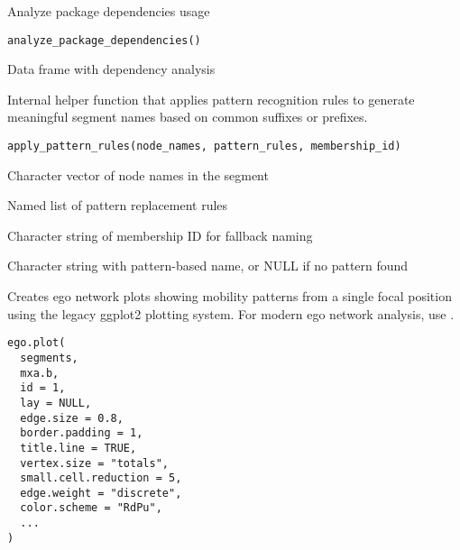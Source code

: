 \documentclass[a4paper]{book}
\begin{document}
%
\begin{Description}
Analyze package dependencies usage
\end{Description}
%
\begin{Usage}
\begin{verbatim}
analyze_package_dependencies()
\end{verbatim}
\end{Usage}
%
\begin{Value}
Data frame with dependency analysis
\end{Value}
%
\begin{Description}
Internal helper function that applies pattern recognition rules to generate
meaningful segment names based on common suffixes or prefixes.
\end{Description}
%
\begin{Usage}
\begin{verbatim}
apply_pattern_rules(node_names, pattern_rules, membership_id)
\end{verbatim}
\end{Usage}
%
\begin{Arguments}
\begin{ldescription}
\item[\code{node\_names}] Character vector of node names in the segment

\item[\code{pattern\_rules}] Named list of pattern replacement rules

\item[\code{membership\_id}] Character string of membership ID for fallback naming
\end{ldescription}
\end{Arguments}
%
\begin{Value}
Character string with pattern-based name, or NULL if no pattern found
\end{Value}
%
\begin{Description}
Creates ego network plots showing mobility patterns from a single focal position
using the legacy ggplot2 plotting system. For modern ego network analysis,
use .
\end{Description}
%
\begin{Usage}
\begin{verbatim}
ego.plot(
  segments,
  mxa.b,
  id = 1,
  lay = NULL,
  edge.size = 0.8,
  border.padding = 1,
  title.line = TRUE,
  vertex.size = "totals",
  small.cell.reduction = 5,
  edge.weight = "discrete",
  color.scheme = "RdPu",
  ...
)
\end{verbatim}
\end{Usage}
\end{document}

